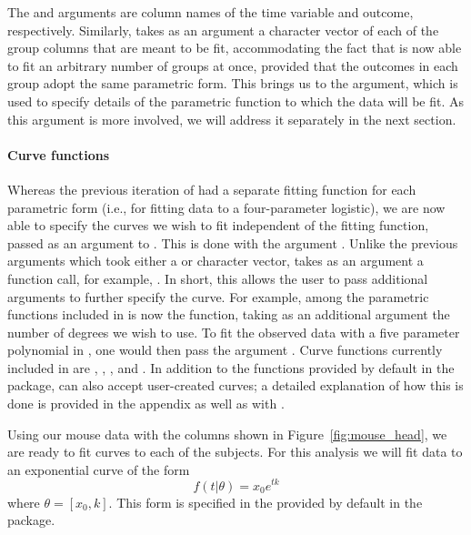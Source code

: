 The  and  arguments are column names of the time variable and outcome, respectively. Similarly,  takes as an argument a character vector of each of the group columns that are meant to be fit, accommodating the fact that  is now able to fit an arbitrary number of groups at once, provided that the outcomes in each group adopt the same parametric form. This brings us to the  argument, which is used to specify details of the parametric function to which the data will be fit. As this argument is more involved, we will address it separately in the next section.



\paragraph{Curve functions} Whereas the previous iteration of  had a separate fitting function for each parametric form (i.e.,  for fitting data to a four-parameter logistic), we are now able to specify the curves we wish to fit independent of the fitting function, passed as an argument to . This is done with the argument . Unlike the previous arguments which took either a  or character  vector,  takes as an argument a function call, for example, . In short, this allows the user to pass additional arguments to further specify the curve. For example, among the parametric functions included in  is now the  function, taking as an additional argument the number of degrees we wish to use. To fit the observed data with a five parameter polynomial in , one would then pass the argument . Curve functions currently included in  are , , , and . In addition to the functions provided by default in the  package,  can also accept user-created curves; a detailed explanation of how this is done is provided in the appendix as well as with .

Using our mouse data with the columns shown in Figure~\ref{fig:mouse_head}, we are ready to fit curves to each of the subjects. For this analysis we will fit data to an exponential curve of the form
\begin{equation}
f(t|\theta) = x_0 e^{tk}
\end{equation}
where $\theta = [x_0, k]$. This form is specified in the  provided by default in the  package.


